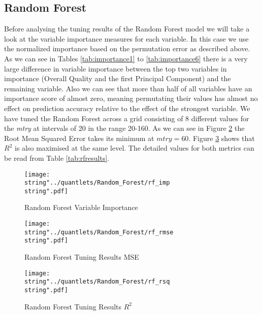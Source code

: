 \subsection{Random Forest}
Before analysing the tuning results of the Random Forest model we will take a look at the variable importance measures for each variable. In this case we use the normalized importance based on the permutation error as described above. As we can see in Tables \ref{tab:importance1} to \ref{tab:importance6} there is a very large difference in variable importance between the top two variables in importance (Overall Quality and the first Principal Component) and the remaining variable. Also we can see that more than half of all variables have an importance score of almost zero, meaning permutating their values has almost no effect on prediction accuracy relative to the effect of the strongest variable. 
We have tuned the Random Forest across a grid consisting of 8 different values for the \textit{mtry} at intervals of 20 in the range 20-160. As we can see in Figure \ref{fig:rf_rmse} the Root Mean Squared Error takes its minimum at $mtry = 60$. Figure \ref{fig:rf_rsq} shows that $R^2$ is also maximised at the same level. The detailed values for both metrics can be read from Table \ref{tab:rfresults}.









\begin{figure}
  \centering
\texttt{[image: \\string"../quantlets/Random\_Forest/rf\_imp\\string".pdf]}
  \caption{Random Forest Variable Importance}\label{fig:rf_imp}
\end{figure}

\begin{figure}
  \centering
\texttt{[image: \\string"../quantlets/Random\_Forest/rf\_rmse\\string".pdf]}
  \caption{Random Forest Tuning Results MSE}\label{fig:rf_rmse}
\end{figure}

\begin{figure}
  \centering
\texttt{[image: \\string"../quantlets/Random\_Forest/rf\_rsq\\string".pdf]}
  \caption{Random Forest Tuning Results $R^2$}\label{fig:rf_rsq}
\end{figure}